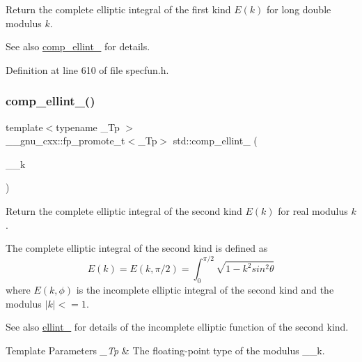 Return the complete elliptic integral of the first kind $ E(k) $ for {\ttfamily long double} modulus $ k $.

\begin{DoxySeeAlso}{See also}
\hyperlink{group__cxx17__math__spec__func_gad559217fb01e7a8b7a6e23eeedda64be}{comp\+\_\+ellint\+\_} for details. 
\end{DoxySeeAlso}


Definition at line 610 of file specfun.\+h.

\mbox{\label{group__cxx17__math__spec__func_gaadf288465eea84ec609d93de96200aaa}} 
\subsubsection{\texorpdfstring{comp\+\_\+ellint\+\_()}{comp\_ellint\_2()}}
{\footnotesize\ttfamily template$<$typename \+\_\+\+Tp $>$ \\
\+\_\+\+\_\+gnu\+\_\+cxx\+::fp\+\_\+promote\+\_\+t$<$\+\_\+\+Tp$>$ std\+::comp\+\_\+ellint\+\_ (\begin{DoxyParamCaption}\item[{\+\_\+\+Tp}]{\+\_\+\+\_\+k }\end{DoxyParamCaption})\hspace{0.3cm}{\ttfamily [inline]}}

Return the complete elliptic integral of the second kind $ E(k) $ for real modulus $ k $.

The complete elliptic integral of the second kind is defined as \[ E(k) = E(k,\pi/2) = \int_0^{\pi/2}\sqrt{1 - k^2 sin^2\theta} \] where $ E(k,\phi) $ is the incomplete elliptic integral of the second kind and the modulus $ |k| <= 1 $. \begin{DoxySeeAlso}{See also}
\hyperlink{group__cxx17__math__spec__func_gad64cb9babb7837d585912b1a94b2cb7d}{ellint\+\_} for details of the incomplete elliptic function of the second kind.
\end{DoxySeeAlso}

\begin{DoxyTemplParams}{Template Parameters}
{\em \+\_\+\+Tp} & The floating-\/point type of the modulus {\ttfamily \+\_\+\+\_\+k}. \\
\hline
\end{DoxyTemplParams}

